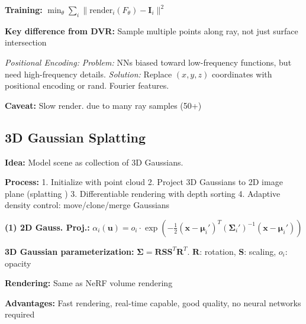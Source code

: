 \textbf{Training:} $\min_\theta \sum_i \|\text{render}_i(F_\theta) - \mathbf{I}_i\|^2$

\textbf{Key difference from DVR:} Sample multiple points along ray, not just surface intersection

\emph{Positional Encoding:}
\textit{Problem:} NNs biased toward low-frequency functions, but need high-frequency details.
\textit{Solution:} Replace $(x,y,z)$ coordinates with positional encoding or rand. Fourier features.

\textbf{Caveat:} Slow render. due to many ray samples (50+)

\subsection{3D Gaussian Splatting}

\textbf{Idea:} Model scene as collection of 3D Gaussians.

\textbf{Process:}
1. Initialize with point cloud
2. Project 3D Gaussians to 2D image plane (\flqq splatting \frqq)
3. Differentiable rendering with depth sorting
4. Adaptive density control: move/clone/merge Gaussians

\textbf{(1) 2D Gauss. Proj.:}
{\tiny
$\alpha_i(\mathbf{u}) = o_i \cdot \exp\left(-\frac{1}{2}(\mathbf{x} - \boldsymbol{\mu}_i')^T (\boldsymbol{\Sigma}_i')^{-1} (\mathbf{x} - \boldsymbol{\mu}_i')\right)$}


\textbf{3D Gaussian parameterization:} {\small$\boldsymbol{\Sigma} = \mathbf{R}\mathbf{S}\mathbf{S}^T\mathbf{R}^T$.
$\mathbf{R}$: rotation, $\mathbf{S}$: scaling, $o_i$: opacity}

\textbf{Rendering:} Same as NeRF volume rendering

\textbf{Advantages:} Fast rendering, real-time capable, good quality, no neural networks required